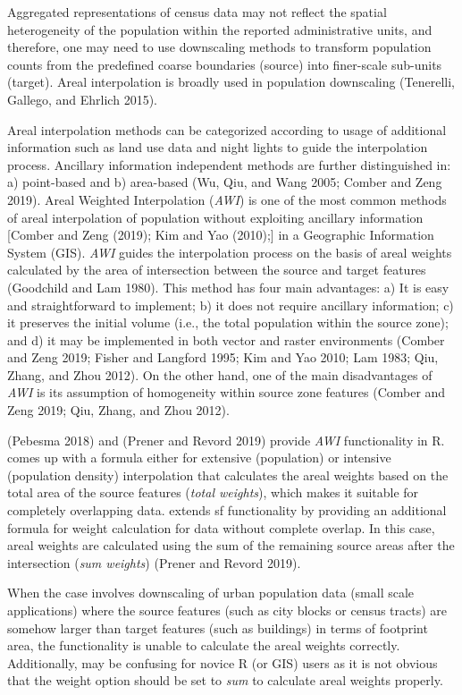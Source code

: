 Aggregated representations of census data may not reflect the spatial heterogeneity of the population within the reported administrative units, and therefore, one may need to use downscaling methods to transform population counts from the predefined coarse boundaries (source) into finer-scale sub-units (target). Areal interpolation is broadly used in population downscaling (Tenerelli, Gallego, and Ehrlich 2015).

Areal interpolation methods can be categorized according to usage of additional information such as land use data and night lights to guide the interpolation process. Ancillary information independent methods are further distinguished in: a) point-based and b) area-based (Wu, Qiu, and Wang 2005; Comber and Zeng 2019). Areal Weighted Interpolation (\emph{AWI}) is one of the most common methods of areal interpolation of population without exploiting ancillary information {[}Comber and Zeng (2019); Kim and Yao (2010);{]} in a Geographic Information System (GIS). \emph{AWI} guides the interpolation process on the basis of areal weights calculated by the area of intersection between the source and target features (Goodchild and Lam 1980). This method has four main advantages: a) It is easy and straightforward to implement; b) it does not require ancillary information; c) it preserves the initial volume (i.e., the total population within the source zone); and d) it may be implemented in both vector and raster environments (Comber and Zeng 2019; Fisher and Langford 1995; Kim and Yao 2010; Lam 1983; Qiu, Zhang, and Zhou 2012). On the other hand, one of the main disadvantages of \emph{AWI} is its assumption of homogeneity within source zone features (Comber and Zeng 2019; Qiu, Zhang, and Zhou 2012).

 (Pebesma 2018) and  (Prener and Revord 2019) provide \emph{AWI} functionality in R.  comes up with a formula either for extensive (population) or intensive (population density) interpolation that calculates the areal weights based on the total area of the source features (\emph{total weights}), which makes it suitable for completely overlapping data.  extends sf functionality by providing an additional formula for weight calculation for data without complete overlap. In this case, areal weights are calculated using the sum of the remaining source areas after the intersection (\emph{sum weights}) (Prener and Revord 2019).

When the case involves downscaling of urban population data (small scale applications) where the source features (such as city blocks or census tracts) are somehow larger than target features (such as buildings) in terms of footprint area, the  functionality is unable to calculate the areal weights correctly. Additionally,  may be confusing for novice R (or GIS) users as it is not obvious that the weight option should be set to \emph{sum} to calculate areal weights properly.

